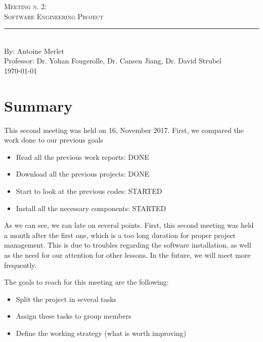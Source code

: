 \documentclass[aps,letterpaper,11pt]{revtex4}
\newcommand{\labno}{Meeting n. 2}
\newcommand{\labtitle}{Software Engineering Project}
\newcommand{\authorname}{Antoine Merlet}
\newcommand{\professor}{Dr. Yohan Fougerolle, Dr. Cansen Jiang, Dr. David Strubel}
\begin{document}
  
\begin{titlepage}
\begin{center}
{\LARGE \textsc{\labno:} \\ \vspace{4pt}}
{\Large \textsc{\labtitle} \\ \vspace{4pt}} 
\rule[13pt]{\textwidth}{1pt} \\ \vspace{150pt}
{\large By: \authorname \\ \vspace{10pt}
Professor: \professor \\ \vspace{10pt}
\today}
\end{center}




\end{titlepage}%
\newpage

\section{Summary}
This second meeting was held on 16, November 2017. 
First, we compared the work done to our previous goals

\begin{itemize}
\item Read all the previous work reports: DONE
\item Download all the previous projects: DONE
\item Start to look at the previous codes: STARTED
\item Install all the necessary components: STARTED
\end{itemize}

As we can see, we ran late on several points. First, this second meeting was held a month after the first one, which is a too long duration for proper project management. This is due to troubles regarding the software installation, as well as the need for our attention for other lessons. In the future, we will meet more frequently. 

The goals to reach for this meeting are the following:

\begin{itemize}
\item Split the project in several tasks
\item Assign these tasks to group members
\item Define the working strategy (what is worth improving)
\end{itemize}
\end{document}
